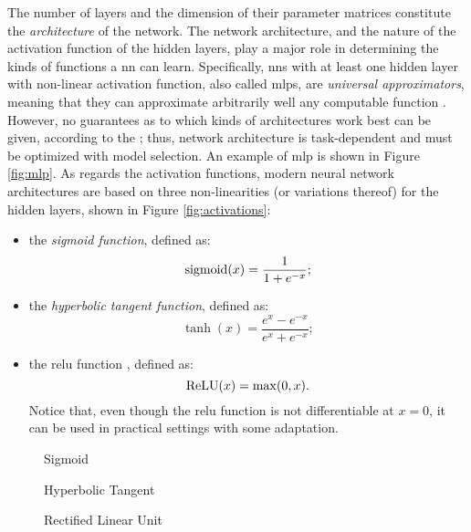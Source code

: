 The number of layers and the dimension of their parameter matrices constitute the \emph{architecture} of the network. The network architecture, and the nature of the activation function of the hidden layers, play a major role in determining the kinds of functions a \gls{nn} can learn. Specifically, \glspl{nn} with at least one hidden layer with non-linear activation function, also called \glspl{mlp}, are \emph{universal approximators}, meaning that they can approximate arbitrarily well any computable function \citep{cybenko1998approximationuniversal}. However, no guarantees as to which kinds of architectures work best can be given, according to the  \citep{wolpert1997freelunchtheorem}; thus, network architecture is task-dependent and must be optimized with model selection. An example of \gls{mlp} is shown in Figure \ref{fig:mlp}. As regards the activation functions, modern neural network architectures are based on three non-linearities (or variations thereof) for the hidden layers, shown in Figure \ref{fig:activations}:
\begin{itemize}
    \item the \emph{sigmoid function}, defined as:
    $$\operatorname{sigmoid}(x) = \frac{1}{1 + e^{-x}};$$
    \item the \emph{hyperbolic tangent function}, defined as:
    $$\tanh(x) = \frac{e^x - e^{-x}}{e^x + e^{-x}};$$
    \item the \gls{relu} function \citep{glorot2011relu}, defined as:
    $$\operatorname{ReLU}(x) = \max(0, x).$$
    Notice that, even though the \gls{relu} function is not differentiable at $x = 0$, it can be used in practical settings with some adaptation.
\end{itemize}
\begin{figure*}[h!]
    \begin{subfigure}[b]{0.32\linewidth}
        \centering
        \resizebox{.8\textwidth}{!}{}
        \caption{Sigmoid}
        \label{fig:sigmoid}
    \end{subfigure}
    \begin{subfigure}[b]{0.32\linewidth}
        \centering
        \resizebox{.8\textwidth}{!}{}
        \caption{Hyperbolic Tangent}
        \label{fig:hyptan}
    \end{subfigure}
    \begin{subfigure}[b]{0.32\linewidth}
        \centering
        \resizebox{.8\textwidth}{!}{}
        \caption{Rectified Linear Unit}
        \label{fig:relu}
    \end{subfigure}
    \caption{Examples of activation functions for the hidden layers (solid line) and their derivatives (dashed line).}
    \label{fig:activations}
\end{figure*}
